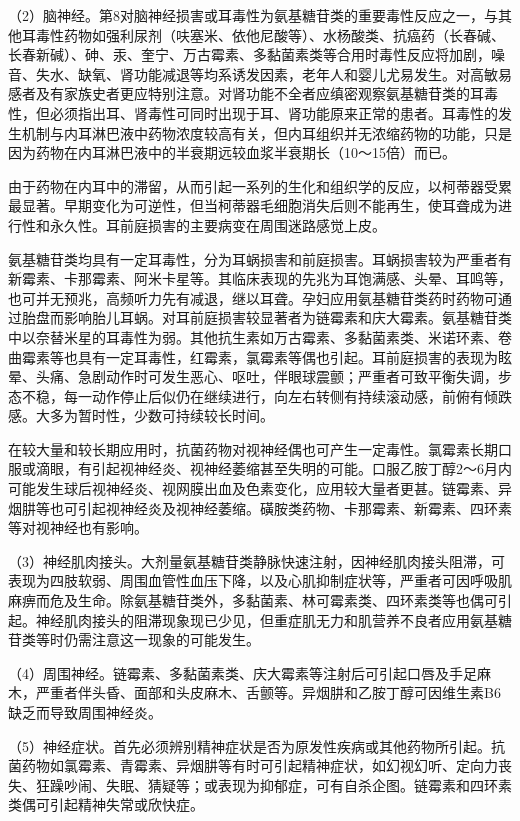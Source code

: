 （2）脑神经。第8对脑神经损害或耳毒性为氨基糖苷类的重要毒性反应之一，与其他耳毒性药物如强利尿剂（呋塞米、依他尼酸等）、水杨酸类、抗癌药（长春碱、长春新碱）、砷、汞、奎宁、万古霉素、多黏菌素类等合用时毒性反应将加剧，噪音、失水、缺氧、肾功能减退等均系诱发因素，老年人和婴儿尤易发生。对高敏易感者及有家族史者更应特别注意。对肾功能不全者应缜密观察氨基糖苷类的耳毒性，但必须指出耳、肾毒性可同时出现于耳、肾功能原来正常的患者。耳毒性的发生机制与内耳淋巴液中药物浓度较高有关，但内耳组织并无浓缩药物的功能，只是因为药物在内耳淋巴液中的半衰期远较血浆半衰期长（10～15倍）而已。

由于药物在内耳中的滞留，从而引起一系列的生化和组织学的反应，以柯蒂器受累最显著。早期变化为可逆性，但当柯蒂器毛细胞消失后则不能再生，使耳聋成为进行性和永久性。耳前庭损害的主要病变在周围迷路感觉上皮。

氨基糖苷类均具有一定耳毒性，分为耳蜗损害和前庭损害。耳蜗损害较为严重者有新霉素、卡那霉素、阿米卡星等。其临床表现的先兆为耳饱满感、头晕、耳鸣等，也可并无预兆，高频听力先有减退，继以耳聋。孕妇应用氨基糖苷类药时药物可通过胎盘而影响胎儿耳蜗。对耳前庭损害较显著者为链霉素和庆大霉素。氨基糖苷类中以奈替米星的耳毒性为弱。其他抗生素如万古霉素、多黏菌素类、米诺环素、卷曲霉素等也具有一定耳毒性，红霉素，氯霉素等偶也引起。耳前庭损害的表现为眩晕、头痛、急剧动作时可发生恶心、呕吐，伴眼球震颤；严重者可致平衡失调，步态不稳，每一动作停止后似仍在继续进行，向左右转侧有持续滚动感，前俯有倾跌感。大多为暂时性，少数可持续较长时间。

在较大量和较长期应用时，抗菌药物对视神经偶也可产生一定毒性。氯霉素长期口服或滴眼，有引起视神经炎、视神经萎缩甚至失明的可能。口服乙胺丁醇2～6月内可能发生球后视神经炎、视网膜出血及色素变化，应用较大量者更甚。链霉素、异烟肼等也可引起视神经炎及视神经萎缩。磺胺类药物、卡那霉素、新霉素、四环素等对视神经也有影响。

（3）神经肌肉接头。大剂量氨基糖苷类静脉快速注射，因神经肌肉接头阻滞，可表现为四肢软弱、周围血管性血压下降，以及心肌抑制症状等，严重者可因呼吸肌麻痹而危及生命。除氨基糖苷类外，多黏菌素、林可霉素类、四环素类等也偶可引起。神经肌肉接头的阻滞现象现已少见，但重症肌无力和肌营养不良者应用氨基糖苷类等时仍需注意这一现象的可能发生。

（4）周围神经。链霉素、多黏菌素类、庆大霉素等注射后可引起口唇及手足麻木，严重者伴头昏、面部和头皮麻木、舌颤等。异烟肼和乙胺丁醇可因维生素B{6}
缺乏而导致周围神经炎。

（5）神经症状。首先必须辨别精神症状是否为原发性疾病或其他药物所引起。抗菌药物如氯霉素、青霉素、异烟肼等有时可引起精神症状，如幻视幻听、定向力丧失、狂躁吵闹、失眠、猜疑等；或表现为抑郁症，可有自杀企图。链霉素和四环素类偶可引起精神失常或欣快症。

